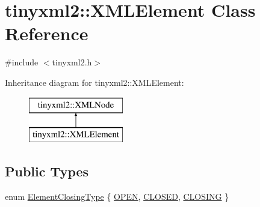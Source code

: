 \hypertarget{classtinyxml2_1_1_x_m_l_element}{}\section{tinyxml2\+:\+:X\+M\+L\+Element Class Reference}
\label{classtinyxml2_1_1_x_m_l_element}


{\ttfamily \#include $<$tinyxml2.\+h$>$}

Inheritance diagram for tinyxml2\+:\+:X\+M\+L\+Element\+:\begin{figure}[H]
\begin{center}
\leavevmode
\includegraphics[height=2.000000cm]{classtinyxml2_1_1_x_m_l_element}
\end{center}
\end{figure}
\subsection*{Public Types}
\begin{DoxyCompactItemize}
\item 
enum \mbox{\hyperlink{classtinyxml2_1_1_x_m_l_element_ab5f90e2493c35702175235127e2935b4}{Element\+Closing\+Type}} \{ \mbox{\hyperlink{classtinyxml2_1_1_x_m_l_element_ab5f90e2493c35702175235127e2935b4a78cf277c55b4655c86458dfecb11d349}{O\+P\+EN}}, 
\mbox{\hyperlink{classtinyxml2_1_1_x_m_l_element_ab5f90e2493c35702175235127e2935b4aa2f1f384020d2d4538ad2ec84930a028}{C\+L\+O\+S\+ED}}, 
\mbox{\hyperlink{classtinyxml2_1_1_x_m_l_element_ab5f90e2493c35702175235127e2935b4aa2857344b98a931536c443cd0cadc4b7}{C\+L\+O\+S\+I\+NG}}
 \}
\end{DoxyCompactItemize}
